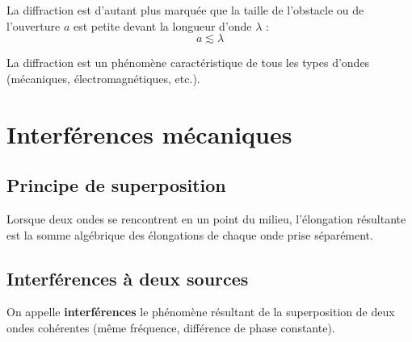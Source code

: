 \begin{propriete}
La diffraction est d'autant plus marquée que la taille de l'obstacle ou de l'ouverture $a$ est petite devant la longueur d'onde $\lambda$ :
\[
a \lesssim \lambda
\]
\end{propriete}

\begin{illus}
\end{illus}

\begin{remarque}
La diffraction est un phénomène caractéristique de tous les types d'ondes (mécaniques, électromagnétiques, etc.).
\end{remarque}

\section{Interférences mécaniques}

\subsection{Principe de superposition}

\begin{loi}
Lorsque deux ondes se rencontrent en un point du milieu, l'élongation résultante est la somme algébrique des élongations de chaque onde prise séparément.
\end{loi}

\subsection{Interférences à deux sources}

\begin{definition}[Interférences]
On appelle \textbf{interférences} le phénomène résultant de la superposition de deux ondes cohérentes (même fréquence, différence de phase constante).
\end{definition}

